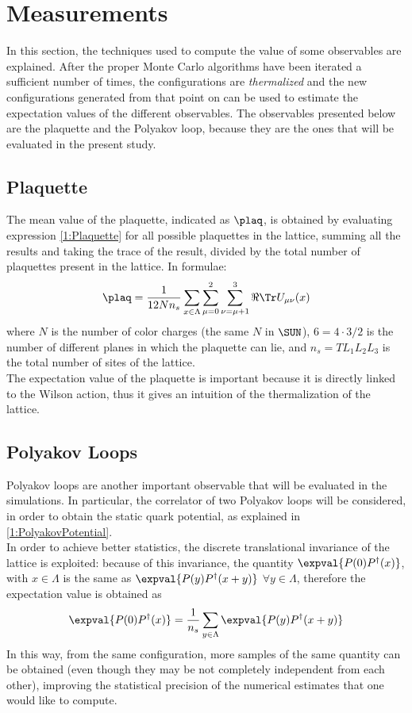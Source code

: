 \section{Measurements}
In this section, the techniques used to compute the value of some observables are explained.
After the proper Monte Carlo algorithms have been iterated a sufficient number of times, the configurations are \emph{thermalized} and the new configurations generated from that point on can be used to estimate the expectation values of the different observables.
The observables presented below are the plaquette and the Polyakov loop, because they are the ones that will be evaluated in the present study.

\subsection{Plaquette}
The mean value of the plaquette, indicated as $\plaq$, is obtained by evaluating expression \eqref{1:Plaquette} for all possible plaquettes in the lattice, summing all the results and taking the trace of the result, divided by the total number of plaquettes present in the lattice.
In formulae:
\begin{equation}
    \plaq = \frac{1}{12 N n_s} \sum_{x\in\Lambda} \sum_{\mu=0}^2 \sum_{\substack{\nu=\mu+1}}^3 \Re\Tr U_{\mu\nu}(x) \label{2:LatticePlaquette}
\end{equation}
where $N$ is the number of color charges (the same $N$ in $\SUN$), $6=4\cdot3/2$ is the number of different planes in which the plaquette can lie, and $n_s=TL_1L_2L_3$ is the total number of sites of the lattice.\\
The expectation value of the plaquette is important because it is directly linked to the Wilson action, thus it gives an intuition of the thermalization of the lattice.

\subsection{Polyakov Loops}
Polyakov loops are another important observable that will be evaluated in the simulations.
In particular, the correlator of two Polyakov loops will be considered, in order to obtain the static quark potential, as explained in \eqref{1:PolyakovPotential}.\\
In order to achieve better statistics, the discrete translational invariance of the lattice is exploited:
because of this invariance, the quantity $\expval{P(0)P^\dagger(x)}$, with $x\in\Lambda$ is the same as $\expval{P(y)P^\dagger(x+y)}$ $\forall y\in\Lambda$, therefore the expectation value is obtained as
\begin{equation}
    \expval{P(0)P^\dagger(x)} = \frac{1}{n_s} \sum_{y\in\Lambda} \expval{P(y)P^\dagger(x+y)} \label{2:nonzeroMomPolyakov}
\end{equation}
In this way, from the same configuration, more samples of the same quantity can be obtained (even though they may be not completely independent from each other), improving the statistical precision of the numerical estimates that one would like to compute.

